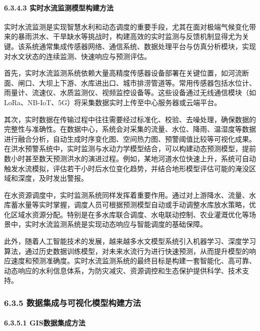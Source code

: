\paragraph{6.3.4.3 实时水流监测模型构建方法}\label{ux5b9eux65f6ux6c34ux6d41ux76d1ux6d4bux6a21ux578bux6784ux5efaux65b9ux6cd5}

实时水流监测是实现智慧水利和动态调度的重要手段，尤其在面对极端气候变化带来的暴雨洪水、干旱缺水等挑战时，构建高效的实时监测与反馈机制显得尤为关键。该系统通常集成传感器网络、通信系统、数据处理平台与仿真分析模块，实现对水文状态的连续监测、快速响应与预测评估。

首先，实时水流监测系统依赖大量高精度传感器设备部署在关键位置，如河流断面、闸口、大坝上下游、水库进出口、城市排涝管道等。常用传感器包括水位计、雨量计、流速仪、水质监测仪、视频监控设备等。这些设备通过无线通信模块（如LoRa、NB-IoT、5G）将采集数据实时上传至中心服务器或云端平台。

其次，实时数据在传输过程中往往需要经过标准化、校验、去噪处理，确保数据的完整性与准确性。在数据中心，系统会对采集的流量、水位、降雨、温湿度等数据进行融合分析，自动生成时序变化图、空间热力图、预警阈值比较等可视化成果。在洪水预警系统中，实时监测与水动力学模型结合，可以构建动态预测模型，提前数小时甚至数天预测洪水的演进过程。例如，某地河道水位快速上升，系统可自动触发水流模拟，评估若干小时后水位变化趋势，并结合地形模型评估可能的淹没区域和深度，及时发出警报。

在水资源调度中，实时监测系统同样发挥着重要作用。通过对上游降水、流量、水库蓄水量等实时掌握，调度人员可根据预测模型自动或手动调整水库放水策略，优化区域水资源分配。特别是在多水库联合调度、水电联动控制、农业灌溉优化等场景中，实时水流监测系统是实现动态响应与智能调度的基础保障。

此外，随着人工智能技术的发展，越来越多水文模型系统引入机器学习、深度学习算法，通过历史数据训练模型，对未来水流行为进行快速预测，从而提升模型的响应速度和预测准确度。实时水流监测系统的最终目标是构建一套智能化、高可靠、动态响应的水利信息体系，为防灾减灾、资源调控和生态保护提供科学、技术支持。

\subsubsection{6.3.5 数据集成与可视化模型构建方法}\label{ux6570ux636eux96c6ux6210ux4e0eux53efux89c6ux5316ux6a21ux578bux6784ux5efaux65b9ux6cd5}

\paragraph{6.3.5.1 GIS数据集成方法}\label{gisux6570ux636eux96c6ux6210ux65b9ux6cd5}

